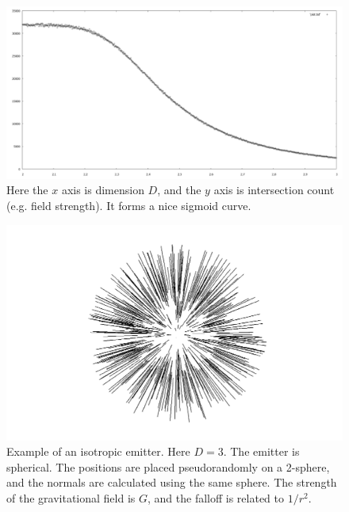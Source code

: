 \documentclass[12pt]{article}
\begin{document}
\begin{figure} 
\centering
  \includegraphics[width = 5 in]{transition.png}
  \caption{
Here the $x$ axis is dimension $D$, and the $y$ axis is intersection count (e.g. field strength).
It forms a nice sigmoid curve.
}
\end{figure}





\pagebreak




\begin{figure} 
\centering
  \includegraphics[width = 5 in]{3.png}
  \caption{
Example of an isotropic emitter.
Here $D = 3$. 
The emitter is spherical.
The positions are placed pseudorandomly on a 2-sphere, and the normals are calculated using the same sphere.
The strength of the gravitational field is $G$, and the falloff is related to $1/r^2$.
}
\end{figure}
\end{document}
